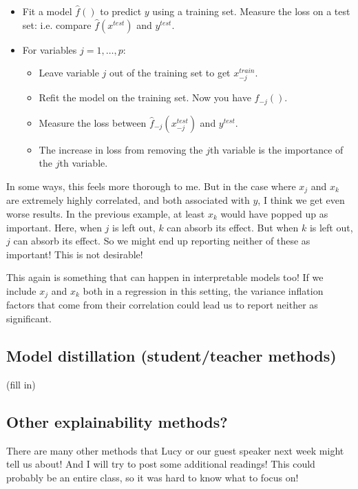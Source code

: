 \begin{itemize}
\item Fit a model $\hat{f}()$ to predict $y$ using a training set. Measure the loss on a test set: i.e. compare $\hat{f}(x^{test})$ and $y^{test}$.
\item For variables $j=1,\ldots,p$:
\begin{itemize}
\item Leave variable $j$ out of the training set to get $x^{train}_{-j}$.
\item Refit the model on the training set. Now you have $\hat{f}_{-j}()$. 
\item Measure the loss between $\hat{{f}}_{-j}({x}^{test}_{-j})$ and $y^{test}$. 
\item The increase in loss from removing the $j$th variable is the importance of the $j$th variable. 
\end{itemize}
\end{itemize}

In some ways, this feels more thorough to me. But in the case where $x_j$ and $x_k$ are extremely highly correlated, and both associated with $y$, I think we get even worse results. In the previous example, at least $x_k$ would have popped up as important. Here, when $j$ is left out, $k$ can absorb its effect. But when $k$ is left out, $j$ can absorb its effect. So we might end up reporting neither of these as important! This is not desirable! 

This again is something that can happen in interpretable models too! If we include $x_j$ and $x_k$ both in a regression in this setting, the variance inflation factors that come from their correlation could lead us to report neither as significant. 

\subsection{Model distillation (student/teacher methods)}

(fill in)


\subsection{Other explainability methods?}

There are many other methods that Lucy or our guest speaker next week might tell us about! And I will try to post some additional readings! This could probably be an entire class, so it was hard to know what to focus on!



